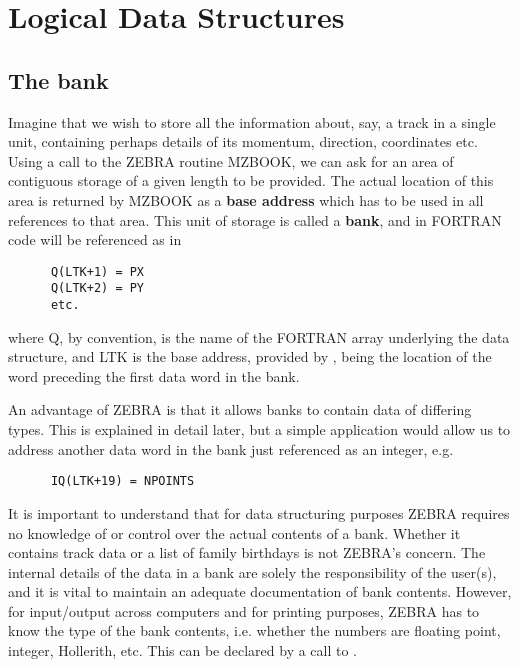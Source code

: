 \section{Logical Data Structures}
\subsection{The bank}
\par
Imagine that we wish to store all the information about, say, a track in
a single unit, containing perhaps details of its momentum, direction,
coordinates etc. Using a call to the ZEBRA routine MZBOOK, we can ask
for an area of contiguous storage of a given length to be provided. The
actual location of this area is returned by MZBOOK as a
{\bf base address} which has to be used in all references to that area.
This unit of storage is called a
{\bf bank}, and in FORTRAN code will be referenced as in
\begin{verbatim}
      Q(LTK+1) = PX
      Q(LTK+2) = PY
      etc.
\end{verbatim}
where Q, by convention, is the name of the FORTRAN array underlying the
data structure, and LTK is the base address,
provided by , being the location of the word
preceding the first data word in the bank.
\par An advantage of ZEBRA is that it allows banks to contain data of
differing types. This is explained in detail later, but a simple
application would allow us to address another data word in the bank just
referenced as an integer, e.g.
\begin{verbatim}
      IQ(LTK+19) = NPOINTS
\end{verbatim}
It is important to understand that for data structuring purposes
ZEBRA requires no knowledge of or control
over the actual contents of a bank. Whether it contains track data or a
list of family birthdays is not ZEBRA's concern. The internal details of
the data in a bank are solely the responsibility of the user(s), and it is
vital to maintain an adequate documentation of bank contents.
However, for input/output across computers and for printing
purposes, ZEBRA has to know the type of the bank contents, i.e. whether
the numbers are floating point, integer, Hollerith, etc.
This can be declared by a call to .
